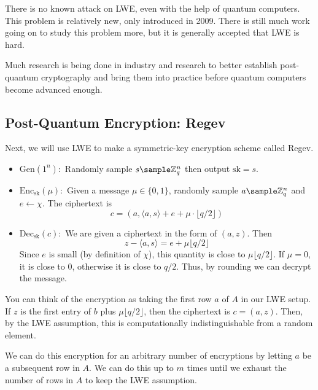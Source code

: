 \begin{remark}
    There is no known attack on LWE, even with the help of quantum computers. This problem is relatively new, only introduced in 2009. There is still much work going on to study this problem more, but it is generally accepted that LWE is hard.

    Much research is being done in industry and research to better establish post-quantum cryptography and bring them into practice before quantum computers become advanced enough.
\end{remark}

\subsection{Post-Quantum Encryption: Regev}

Next, we will use LWE to make a symmetric-key encryption scheme called Regev.

\begin{itemize}
    \item $\text{Gen}(1^n):$ Randomly sample $s \sample \ZZ_q^n$ then output $\text{sk} = s$.
    \item $\text{Enc}_{\text{sk}}(\mu):$ Given a message $\mu \in \{0, 1\}$, randomly sample $a \sample \ZZ_q^n$ and $e \gets \chi$. The ciphertext is
    \[ c = (a, \langle a, s \rangle + e + \mu \cdot \lfloor q / 2 \rfloor)\]
    \item $\text{Dec}_\text{sk}(c):$ We are given a ciphertext in the form of $(a, z)$. Then \[ z - \langle a, s\rangle = e + \mu \lfloor q / 2 \rfloor\]
    Since $e$ is small (by definition of $\chi$), this quantity is close to $\mu \lfloor q/2 \rfloor $. If $\mu =0$, it is close to 0, otherwise it is close to $q/2$. Thus, by rounding we can decrypt the message.
\end{itemize}

You can think of the encryption as taking the first row $a$ of $A$ in our LWE setup. If $z$ is the first entry of $b$ plus $\mu \lfloor q/2 \rfloor$, then the ciphertext is $c = (a, z)$. Then, by the LWE assumption, this is computationally indistinguishable from a random element.

\begin{center}
    \def\svgwidth{0.75\columnwidth}
    
\end{center}

We can do this encryption for an arbitrary number of encryptions by letting $a$ be a subsequent row in $A$. We can do this up to $m$ times until we exhaust the number of rows in $A$ to keep the LWE assumption.

